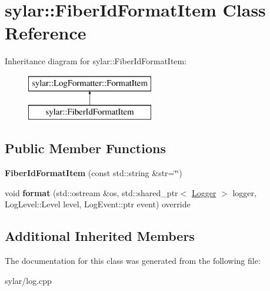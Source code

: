 \hypertarget{classsylar_1_1FiberIdFormatItem}{\section{sylar\-:\-:Fiber\-Id\-Format\-Item Class Reference}
\label{classsylar_1_1FiberIdFormatItem}
}
Inheritance diagram for sylar\-:\-:Fiber\-Id\-Format\-Item\-:\begin{figure}[H]
\begin{center}
\leavevmode
\includegraphics[height=2.000000cm]{classsylar_1_1FiberIdFormatItem}
\end{center}
\end{figure}
\subsection*{Public Member Functions}
\begin{DoxyCompactItemize}
\item 
\hypertarget{classsylar_1_1FiberIdFormatItem_ae1fbc2fdf17e128c909b1113c7178ed5}{{\bfseries Fiber\-Id\-Format\-Item} (const std\-::string \&str=\char`\"{}\char`\"{})}\label{classsylar_1_1FiberIdFormatItem_ae1fbc2fdf17e128c909b1113c7178ed5}

\item 
\hypertarget{classsylar_1_1FiberIdFormatItem_ae5aed0330781213fa8053deb93eb5aae}{void {\bfseries format} (std\-::ostream \&os, std\-::shared\-\_\-ptr$<$ \hyperlink{classsylar_1_1Logger}{Logger} $>$ logger, Log\-Level\-::\-Level level, Log\-Event\-::ptr event) override}\label{classsylar_1_1FiberIdFormatItem_ae5aed0330781213fa8053deb93eb5aae}

\end{DoxyCompactItemize}
\subsection*{Additional Inherited Members}


The documentation for this class was generated from the following file\-:\begin{DoxyCompactItemize}
\item 
sylar/log.\-cpp\end{DoxyCompactItemize}
